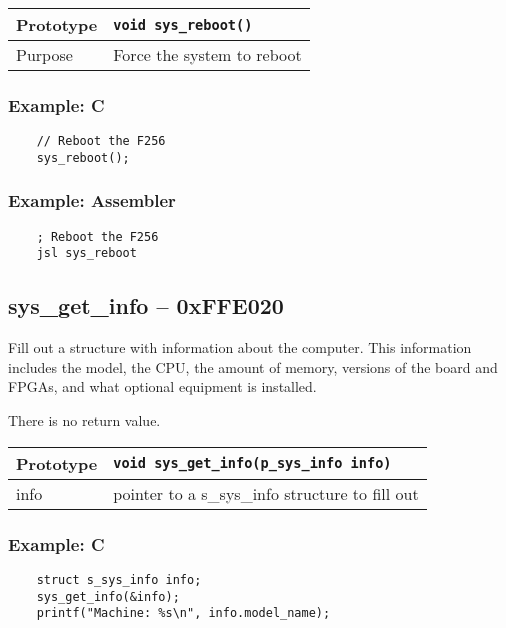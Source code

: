 \bigskip

\begin{table}[!h]\begin{tabular}{|l||l|} \hline
Prototype & \lstinline!void sys_reboot()! \\ \hline
Purpose & Force the system to reboot \\ \hline
\end{tabular}\end{table}

\subsubsection*{Example: C}
\begin{lstlisting}
	// Reboot the F256
    sys_reboot();	
\end{lstlisting}

\subsubsection*{Example: Assembler}
\begin{verbatim}
	; Reboot the F256
    jsl sys_reboot
\end{verbatim}

\subsection*{sys\_get\_info -- 0xFFE020}
Fill out a structure with information about the computer. This information includes the model, the CPU, the amount of memory,
versions of the board and FPGAs, and what optional equipment is installed.

There is no return value.

\bigskip

\begin{tabular}{|l||l|} \hline
Prototype & \lstinline!void sys_get_info(p_sys_info info)! \\ \hline
info & pointer to a s\_sys\_info structure to fill out \\ \hline
\end{tabular}

\subsubsection*{Example: C}
\begin{lstlisting}
    struct s_sys_info info;
    sys_get_info(&info);
    printf("Machine: %s\n", info.model_name);	
\end{lstlisting}

